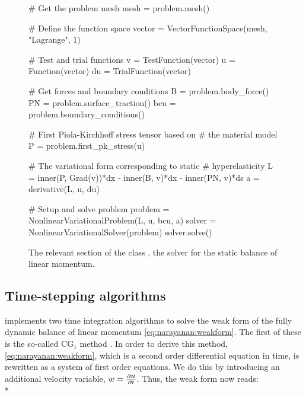 \begin{figure}[!t]
\bwfig
\begin{python}
# Get the problem mesh
mesh = problem.mesh()

# Define the function space
vector = VectorFunctionSpace(mesh, "Lagrange", 1)

# Test and trial functions
v = TestFunction(vector)
u = Function(vector)
du = TrialFunction(vector)

# Get forces and boundary conditions
B = problem.body_force()
PN = problem.surface_traction()
bcu = problem.boundary_conditions()

# First Piola-Kirchhoff stress tensor based on
# the material model
P = problem.first_pk_stress(u)

# The variational form corresponding to static
# hyperelasticity
L = inner(P, Grad(v))*dx - inner(B, v)*dx - inner(PN, v)*ds
a = derivative(L, u, du)

# Setup and solve problem
problem = NonlinearVariationalProblem(L, u, bcu, a)
solver = NonlinearVariationalSolver(problem)
solver.solve()
\end{python}
\caption{The relevant section of the class
, the solver for the static balance of
linear momentum.}
\label{code:narayanan:staticmomentumsolver}
\end{figure}

\vspace*{-3pt}
\subsection{Time-stepping algorithms}

\twist{} implements two time integration algorithms to solve the weak
form of the fully dynamic balance of linear momentum
\eqref{eq:narayanan:weakform}. The first of these is the
so-called CG$_{1}$ method \citep{ErikssonEstepHansboEtAl1996}. In order
to derive this method, \eqref{eq:narayanan:weakform}, which is
a second order differential equation in time, is rewritten as a system
of first order equations. We do this by introducing an additional
velocity variable, $\mbox{$ w$} = \frac{\partial \mbox{$ u$}}{\partial t}$. Thus, the
weak form now reads: \\*\pagebreak

